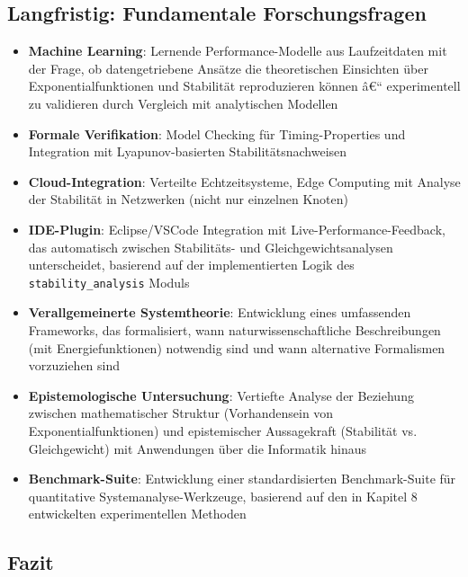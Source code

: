 ﻿\documentclass[a4paper,12pt]{report}
\theoremstyle{definition}
\begin{document}
\subsection{Langfristig: Fundamentale Forschungsfragen}

\begin{itemize}
	\item[-] \textbf{Machine Learning}: Lernende Performance-Modelle aus Laufzeitdaten mit der Frage, ob datengetriebene Ansätze die theoretischen Einsichten über Exponentialfunktionen und Stabilität reproduzieren können â€“ experimentell zu validieren durch Vergleich mit analytischen Modellen
	
	\item[-] \textbf{Formale Verifikation}: Model Checking für Timing-Properties und Integration mit Lyapunov-basierten Stabilitätsnachweisen
	
	\item[-] \textbf{Cloud-Integration}: Verteilte Echtzeitsysteme, Edge Computing mit Analyse der Stabilität in Netzwerken (nicht nur einzelnen Knoten)
	
	\item[-] \textbf{IDE-Plugin}: Eclipse/VSCode Integration mit Live-Performance-Feedback, das automatisch zwischen Stabilitäts- und Gleichgewichtsanalysen unterscheidet, basierend auf der implementierten Logik des \texttt{stability\_analysis} Moduls
	
	\item[-] \textbf{Verallgemeinerte Systemtheorie}: Entwicklung eines umfassenden Frameworks, das formalisiert, wann naturwissenschaftliche Beschreibungen (mit Energiefunktionen) notwendig sind und wann alternative Formalismen vorzuziehen sind
	
	\item[-] \textbf{Epistemologische Untersuchung}: Vertiefte Analyse der Beziehung zwischen mathematischer Struktur (Vorhandensein von Exponentialfunktionen) und epistemischer Aussagekraft (Stabilität vs. Gleichgewicht) mit Anwendungen über die Informatik hinaus
	
	\item[-] \textbf{Benchmark-Suite}: Entwicklung einer standardisierten Benchmark-Suite für quantitative Systemanalyse-Werkzeuge, basierend auf den in Kapitel 8 entwickelten experimentellen Methoden
\end{itemize}

\subsection{Fazit}
\label{subsec:fazit}
\end{document}
